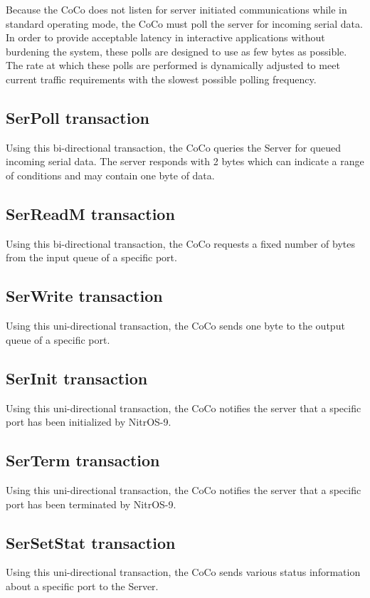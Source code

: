 \documentclass{article}
\begin{document}
Because the CoCo does not listen for server initiated communications while in standard operating mode, the CoCo must poll the server for incoming serial data.  In order to provide acceptable latency in interactive applications without burdening the system, these polls are designed to use as few bytes as possible.  The rate at which these polls are performed is dynamically adjusted to meet current traffic requirements with the slowest possible polling frequency.

\subsection{SerPoll transaction}
Using this bi-directional transaction, the CoCo queries the Server for queued incoming serial data.  The server responds with 2 bytes which can indicate a range of conditions and may contain one byte of data.

\subsection{SerReadM transaction}
Using this bi-directional transaction, the CoCo requests a fixed number of bytes from the input queue of a specific port.

\subsection{SerWrite transaction}
Using this uni-directional transaction, the CoCo sends one byte to the output queue of a specific port.

\subsection{SerInit transaction}
Using this uni-directional transaction, the CoCo notifies the server that a specific port has been initialized by NitrOS-9.

\subsection{SerTerm transaction}
Using this uni-directional transaction, the CoCo notifies the server that a specific port has been terminated by NitrOS-9.

\subsection{SerSetStat transaction}
Using this uni-directional transaction, the CoCo sends various status information about a specific port to the Server.
\end{document}
